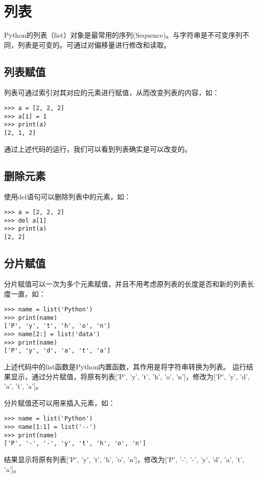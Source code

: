 \section{列表}

Python的列表（list）对象是最常用的序列(Sequence)。与字符串是不可变序列不同，列表是可变的。可通过对偏移量进行修改和读取。

\subsection{列表赋值}

列表可通过索引对其对应的元素进行赋值，从而改变列表的内容，如：

\begin{lstlisting}
>>> a = [2, 2, 2]
>>> a[1] = 1
>>> print(a)
[2, 1, 2]
\end{lstlisting}

通过上述代码的运行，我们可以看到列表确实是可以改变的。

\subsection{删除元素}

使用del语句可以删除列表中的元素，如：

\begin{lstlisting}
>>> a = [2, 2, 2]
>>> del a[1]
>>> print(a)
[2, 2]
\end{lstlisting}

\subsection{分片赋值}

分片赋值可以一次为多个元素赋值，并且不用考虑原列表的长度是否和新的列表长度一直，如：

\begin{lstlisting}
>>> name = list('Python')
>>> print(name)
['P', 'y', 't', 'h', 'o', 'n']
>>> name[2:] = list('data')
>>> print(name)
['P', 'y', 'd', 'a', 't', 'a']
\end{lstlisting}

上述代码中的list函数是Python内置函数，其作用是将字符串转换为列表。
运行结果显示，通过分片赋值，将原有列表['P', 'y', 't', 'h', 'o', 'n']，修改为['P', 'y', 'd', 'a', 't', 'a']。

分片赋值还可以用来插入元素，如：

\begin{lstlisting}
>>> name = list('Python')
>>> name[1:1] = list('--')
>>> print(name)
['P', '-', '-', 'y', 't', 'h', 'o', 'n']
\end{lstlisting}
结果显示将原有列表['P', 'y', 't', 'h', 'o', 'n']，修改为['P', '-', '-', 'y', 'd', 'a', 't', 'a']。

